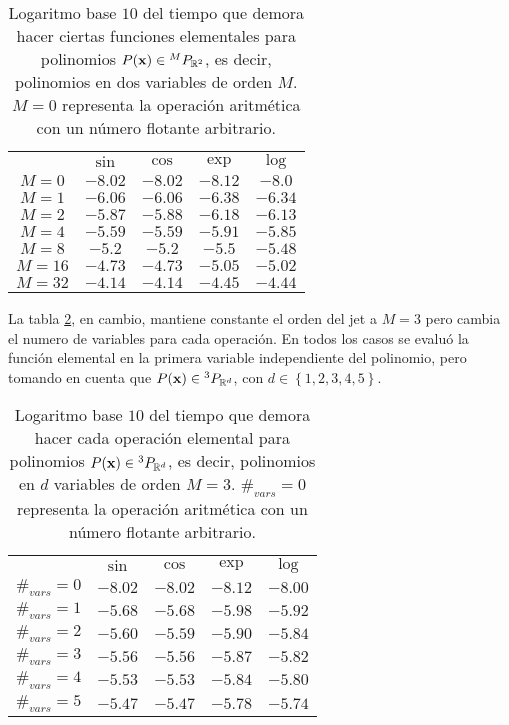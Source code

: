 \begin{table}[h!]
\centering
\begin{tabular}{c|cccc}
\toprule
     & \textbf{$\sin$} & \textbf{$\cos$} & \textbf{$\exp$} & \textbf{$\log$} \\ \cmidrule(l){1-5} 
$M=0$  & $-8.02$ & $-8.02$ & $-8.12$ & $-8.0 $ \\
$M=1$  & $-6.06$ & $-6.06$ & $-6.38$ & $-6.34$ \\
$M=2$  & $-5.87$ & $-5.88$ & $-6.18$ & $-6.13$ \\
$M=4$  & $-5.59$ & $-5.59$ & $-5.91$ & $-5.85$ \\
$M=8$  & $-5.2 $ & $-5.2 $ & $-5.5 $ & $-5.48$ \\
$M=16$ & $-4.73$ & $-4.73$ & $-5.05$ & $-5.02$ \\
$M=32$ & $-4.14$ & $-4.14$ & $-4.45$ & $-4.44$ \\ \bottomrule 
\end{tabular}
\caption{Logaritmo base $10$ del tiempo que demora hacer ciertas funciones elementales para polinomios $P(\mathbf{x}) \in {^{M}P_{\mathbb{R}^ 2} }$, es decir, polinomios en dos variables de orden $M$. $M=0$ representa la operación aritmética con un número flotante arbitrario.}
\label{table:times_algpoli_1}
\end{table}

La tabla \ref{table:times_algpoli_2}, en cambio, mantiene constante el orden del jet a $M=3$ pero cambia el numero de variables para cada operación. En todos los casos se evaluó la función elemental en la primera variable independiente del polinomio, pero tomando en cuenta que $P(\mathbf{x}) \in {^{3}P_{\mathbb{R}^ d} }$, con $d \in \left\lbrace 1,2,3,4,5 \right\rbrace$. 

\begin{table}[h!]
\centering
\begin{tabular}{c|cccc}
\toprule
     & \textbf{$\sin$} & \textbf{$\cos$} & \textbf{$\exp$} & \textbf{$\log$} \\ \cmidrule(l){1-5} 
 $\#_{vars} = 0$ & $-8.02$ & $-8.02$ & $-8.12$ & $-8.00$ \\
 $\#_{vars} = 1$ & $-5.68$ & $-5.68$ & $-5.98$ & $-5.92$ \\
 $\#_{vars} = 2$ & $-5.60$ & $-5.59$ & $-5.90$ & $-5.84$ \\
 $\#_{vars} = 3$ & $-5.56$ & $-5.56$ & $-5.87$ & $-5.82$ \\
 $\#_{vars} = 4$ & $-5.53$ & $-5.53$ & $-5.84$ & $-5.80$ \\
 $\#_{vars} = 5$ & $-5.47$ & $-5.47$ & $-5.78$ & $-5.74$ \\ \bottomrule 
\end{tabular}
\caption{Logaritmo base $10$ del tiempo que demora hacer cada operación elemental para polinomios $P(\mathbf{x}) \in {^{3}P_{\mathbb{R}^ d} }$, es decir, polinomios en $d$ variables de orden $M = 3$. $\#_{vars}=0$ representa la operación aritmética con un número flotante arbitrario.}
\label{table:times_algpoli_2}
\end{table}

